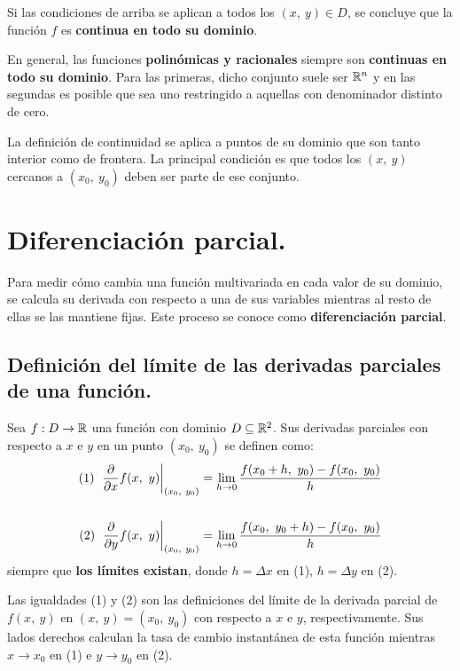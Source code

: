 \documentclass[12pt]{article}
\begin{document}
Si las condiciones de arriba se aplican a todos los $(x, \ y) \in D$, se concluye que la función $f$ es \textbf{continua en todo su dominio}.

En general, las funciones \textbf{polinómicas y racionales} siempre son \textbf{continuas en todo su dominio}. Para las primeras, dicho conjunto suele ser $\mathbb{R}^{n}$ y en las segundas es posible que sea uno restringido a aquellas con denominador distinto de cero.

La definición de continuidad se aplica a puntos de su dominio que son tanto interior como de frontera. La principal condición es que todos los $(x, \ y)$ cercanos a $(x_{0}, \ y_{0})$ deben ser parte de ese conjunto.


\section{Diferenciación parcial.}

Para medir cómo cambia una función multivariada en cada valor de su dominio, se calcula su derivada con respecto a una de sus variables mientras al resto de ellas se las mantiene fijas. Este proceso se conoce como \textbf{diferenciación parcial}.

\subsection{Definición del límite de las derivadas parciales de una función.}

Sea $f:D \to \mathbb{R}$ una función con dominio $D \subseteq \mathbb{R}^{2}$. Sus derivadas parciales con respecto a $x$ e $y$ en un punto $(x_{0}, \ y_{0})$ se definen como:
\begin{align*}
  (1) \ \left.\frac{\partial }{\partial x} f(x, \ y) \right|_{(x_{0}, \ y_{0})} &= \lim_{h \to 0} \frac{f(x_{0} + h, \ y_{0}) - f(x_{0}, \ y_{0})}{h} \\ \\
  (2) \ \left.\frac{\partial }{\partial y} f(x, \ y) \right|_{(x_{0}, \ y_{0})} &= \lim_{h \to 0} \frac{f(x_{0}, \ y_{0} + h) - f(x_{0}, \ y_{0})}{h}
\end{align*}
siempre que \textbf{los límites existan}, donde $h = \Delta x$ en (1), $h = \Delta y$ en (2).

Las igualdades (1) y (2) son las definiciones del límite de la derivada parcial de $f(x, \ y)$ en $(x, \ y) = (x_{0}, \ y_{0})$ con respecto a $x$ e $y$, respectivamente. Sus lados derechos calculan la tasa de cambio instantánea de esta función mientras $x \to x_{0}$ en (1) e $y \to y_{0}$ en (2).
\end{document}
